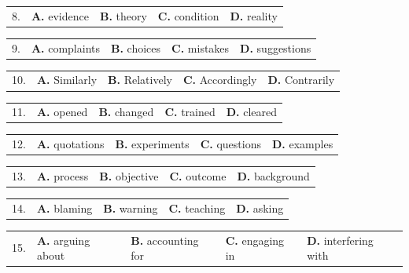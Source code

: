 \documentclass[UTF8,11pt]{ctexart}
\begin{document}
\noindent\begin{tabularx}{\linewidth}{@{}lXXXX@{}}8. & \textbf{A.} evidence & \textbf{B.} theory & \textbf{C.} condition & \textbf{D.} reality\\\end{tabularx}\par

\noindent\begin{tabularx}{\linewidth}{@{}lXXXX@{}}9. & \textbf{A.} complaints & \textbf{B.} choices & \textbf{C.} mistakes & \textbf{D.} suggestions\\\end{tabularx}\par

\noindent\begin{tabularx}{\linewidth}{@{}lXXXX@{}}10. & \textbf{A.} Similarly & \textbf{B.} Relatively & \textbf{C.} Accordingly & \textbf{D.} Contrarily\\\end{tabularx}\par

\noindent\begin{tabularx}{\linewidth}{@{}lXXXX@{}}11. & \textbf{A.} opened & \textbf{B.} changed & \textbf{C.} trained & \textbf{D.} cleared\\\end{tabularx}\par

\noindent\begin{tabularx}{\linewidth}{@{}lXXXX@{}}12. & \textbf{A.} quotations & \textbf{B.} experiments & \textbf{C.} questions & \textbf{D.} examples\\\end{tabularx}\par

\noindent\begin{tabularx}{\linewidth}{@{}lXXXX@{}}13. & \textbf{A.} process & \textbf{B.} objective & \textbf{C.} outcome & \textbf{D.} background\\\end{tabularx}\par

\noindent\begin{tabularx}{\linewidth}{@{}lXXXX@{}}14. & \textbf{A.} blaming & \textbf{B.} warning & \textbf{C.} teaching & \textbf{D.} asking\\\end{tabularx}\par

\noindent\begin{tabularx}{\linewidth}{@{}lXXXX@{}}15. & \textbf{A.} arguing about & \textbf{B.} accounting for & \textbf{C.} engaging in & \textbf{D.} interfering with\\\end{tabularx}\par
\end{document}
